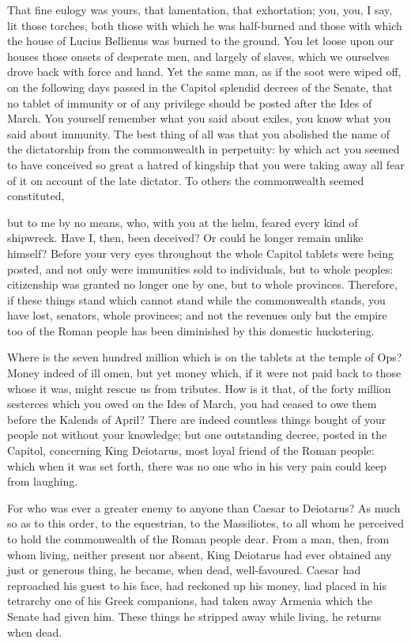  That fine eulogy was yours, that lamentation, that exhortation; you, you, I say, lit those torches, both those with which he was half-burned and those with which the house of Lucius Bellienus was burned to the ground. You let loose upon our houses those onsets of desperate men, and largely of slaves, which we ourselves drove back with force and hand. Yet the same man, as if the soot were wiped off, on the following days passed in the Capitol splendid decrees of the Senate, that no tablet of immunity or of any privilege should be posted after the Ides of March. You yourself remember what you said about exiles, you know what you said about immunity. The best thing of all was that you abolished the name of the dictatorship from the commonwealth in perpetuity: by which act you seemed to have conceived so great a hatred of kingship that you were taking away all fear of it on account of the late dictator. To others the commonwealth seemed constituted,

 but to me by no means, who, with you at the helm, feared every kind of shipwreck. Have I, then, been deceived? Or could he longer remain unlike himself? Before your very eyes throughout the whole Capitol tablets were being posted, and not only were immunities sold to individuals, but to whole peoples: citizenship was granted no longer one by one, but to whole provinces. Therefore, if these things stand which cannot stand while the commonwealth stands, you have lost, senators, whole provinces; and not the revenues only but the empire too of the Roman people has been diminished by this domestic huckstering.

 Where is the seven hundred million which is on the tablets at the temple of Ops? Money indeed of ill omen, but yet money which, if it were not paid back to those whose it was, might rescue us from tributes. How is it that, of the forty million sesterces which you owed on the Ides of March, you had ceased to owe them before the Kalends of April? There are indeed countless things bought of your people not without your knowledge; but one outstanding decree, posted in the Capitol, concerning King Deiotarus, most loyal friend of the Roman people: which when it was set forth, there was no one who in his very pain could keep from laughing.

 For who was ever a greater enemy to anyone than Caesar to Deiotarus? As much so as to this order, to the equestrian, to the Massiliotes, to all whom he perceived to hold the commonwealth of the Roman people dear. From a man, then, from whom living, neither present nor absent, King Deiotarus had ever obtained any just or generous thing, he became, when dead, well-favoured. Caesar had reproached his guest to his face, had reckoned up his money, had placed in his tetrarchy one of his Greek companions, had taken away Armenia which the Senate had given him. These things he stripped away while living, he returns when dead.

